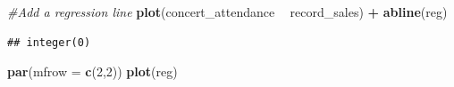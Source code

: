 \documentclass[]{book}
\newenvironment{Shaded}{\begin{snugshade}}{\end{snugshade}}
\newcommand{\CommentTok}[1]{\textcolor[rgb]{0.56,0.35,0.01}{\textit{#1}}}
\newcommand{\DataTypeTok}[1]{\textcolor[rgb]{0.13,0.29,0.53}{#1}}
\newcommand{\DecValTok}[1]{\textcolor[rgb]{0.00,0.00,0.81}{#1}}
\newcommand{\KeywordTok}[1]{\textcolor[rgb]{0.13,0.29,0.53}{\textbf{#1}}}
\newcommand{\NormalTok}[1]{#1}
\newcommand{\OperatorTok}[1]{\textcolor[rgb]{0.81,0.36,0.00}{\textbf{#1}}}
\newcommand{\StringTok}[1]{\textcolor[rgb]{0.31,0.60,0.02}{#1}}
\begin{document}
\begin{Shaded}
\begin{Highlighting}[]
\CommentTok{#Add a regression line}
\KeywordTok{plot}\NormalTok{(concert_attendance }\OperatorTok{~}\StringTok{ }\NormalTok{record_sales) }\OperatorTok{+}\StringTok{ }\KeywordTok{abline}\NormalTok{(reg)}
\end{Highlighting}
\end{Shaded}

\begin{verbatim}
## integer(0)
\end{verbatim}

\begin{Shaded}
\begin{Highlighting}[]
\KeywordTok{par}\NormalTok{(}\DataTypeTok{mfrow =} \KeywordTok{c}\NormalTok{(}\DecValTok{2}\NormalTok{,}\DecValTok{2}\NormalTok{))}
\KeywordTok{plot}\NormalTok{(reg)}
\end{Highlighting}
\end{Shaded}
\end{document}
